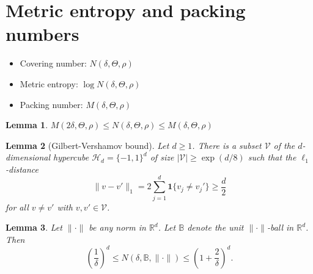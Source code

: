 \documentclass[11pt,letterpaper]{article}
\theoremstyle{plain}
\newtheorem{lemma}{\quad\quad Lemma}
\theoremstyle{definition}
\theoremstyle{remark}
\begin{document}
\section{Metric entropy and packing numbers}
\begin{itemize}
    \item
        Covering number: $N(\delta,\Theta,\rho)$
    \item
        Metric entropy: $\log N(\delta,\Theta,\rho)$
    \item
        Packing number: $M(\delta,\Theta,\rho)$
\end{itemize}
\begin{lemma}
    $M(2\delta,\Theta,\rho)\leq N(\delta,\Theta,\rho)\leq M(\delta,\Theta,\rho)$
\end{lemma}
\begin{lemma}[Gilbert-Vershamov bound]
    Let $d\geq 1$. There is a subset $\mathcal{V}$ of the $d$-dimensional hypercube $\mathcal{H}_d=\{-1,1\}^d$ of size $|\mathcal{V}|\geq \exp(d/8)$ such that the $\ell_1$-distance
    $$
    \|v-v'\|_1 =2\sum_{j=1}^d \mathbf{1}\{v_j\neq v_j'\}\geq \frac{d}{2}
    $$
    for all $v\neq v'$ with $v,v'\in \mathcal{V}$.
\end{lemma}
\begin{lemma}
    Let $\|\cdot\|$ be any norm in $\mathbb{R}^d$.
    Let $\mathbb{B}$ denote the unit $\|\cdot\|$-ball in $\mathbb{R}^d$. Then
    $$
    \left(\frac{1}{\delta}\right)^d
    \leq 
    N(\delta,\mathbb{B},\|\cdot\|)
    \leq
    \left(1+\frac{2}{\delta}\right)^d.
    $$
\end{lemma}
\end{document}
